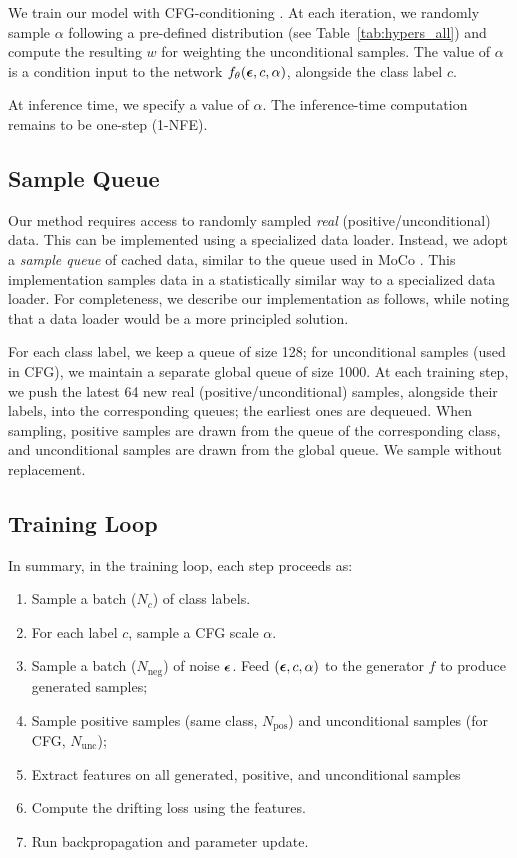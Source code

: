 We train our model with CFG-conditioning \cite{geng2025improved}. At each iteration, we randomly sample $\alpha$ following a pre-defined distribution (see Table~\ref{tab:hypers_all}) and compute the resulting $w$ for weighting the unconditional samples. The value of $\alpha$ is a condition input to the network $f_\theta({\boldsymbol{\epsilon}}, c, \alpha)$, alongside the class label $c$.

At inference time, we specify a value of $\alpha$. The inference-time computation remains to be one-step (1-NFE).

\subsection{Sample Queue}
\label{sec:appendix_sample_queue}

Our method requires access to randomly sampled \textit{real} (positive/unconditional) data. This can be implemented using a specialized data loader. 
Instead, we adopt a \textit{sample queue} of cached data, similar to the queue used in MoCo \cite{he2020momentum}.
This implementation samples data in a statistically similar way to a specialized data loader.
For completeness, we describe our implementation as follows, while noting that a data loader would be a more principled solution.  

For each class label, we keep a queue of size 128; for unconditional samples (used in CFG), we maintain a separate global queue of size 1000.
At each training step, we push the latest 64 new real (positive/unconditional) samples, alongside their labels, into the corresponding queues; the earliest ones are dequeued.
When sampling, positive samples are drawn from the queue of the corresponding class, and unconditional samples are drawn from the global queue.
We sample without replacement.

\subsection{Training Loop}
\label{sec:appendix_training_loop}

In summary, in the training loop, each step proceeds as:
\begin{enumerate}[itemsep=2pt, topsep=2pt, parsep=2pt, partopsep=2pt]
    \item Sample a batch ($N_c$) of class labels.
    \item For each label $c$, sample a CFG scale $\alpha$.
    \item Sample a batch ($N_\text{neg}$) of noise ${\boldsymbol{\epsilon}}$. Feed $({\boldsymbol{\epsilon}}, c, \alpha)$ to the generator $f$ to produce generated samples;
    \item Sample positive samples (same class, $N_\text{pos}$) and unconditional samples (for CFG, $N_\text{unc}$);
    \item Extract features on all generated, positive, and unconditional samples
    \item Compute the drifting loss using the features.
    \item Run backpropagation and parameter update.
\end{enumerate}

